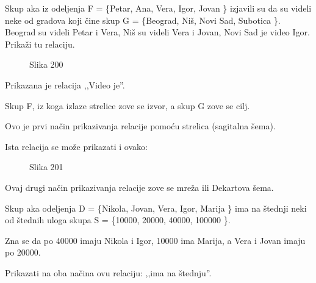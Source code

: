 

    \begin{zad}

        Skup \dj aka iz odeljenja F = \{Petar, Ana, Vera, Igor, Jovan \} izjavili su da su videli neke od gradova koji \v cine skup G = \{Beograd, Ni\v s, Novi Sad, Subotica \}. Beograd su videli Petar i Vera, Ni\v s su videli Vera i Jovan, Novi Sad je video Igor. Prika\v zi tu relaciju.

    \end{zad}



    \begin{figure}[H] 

        \center


        \caption{Slika 200}

        \label{Slika200}

    \end{figure}



    Prikazana je relacija ,,Video je''.



    Skup F, iz koga izlaze strelice zove se izvor, a skup G zove se cilj.



    Ovo je prvi na\v cin prikazivanja relacije pomo\' cu strelica (sagitalna \v sema).



    Ista relacija se mo\v ze prikazati i ovako:



    \begin{figure}[H] 

        \center


        \caption{Slika 201}

        \label{Slika201}

    \end{figure}



    Ovaj drugi na\v cin prikazivanja relacije zove se mre\v za ili Dekartova \v sema.



    \begin{zad}

        Skup \dj aka odeljenja D = \{Nikola, Jovan, Vera, Igor, Marija \} ima na \v stednji neki od \v stednih uloga skupa S = \{10000, 20000, 40000, 100000 \}.



        Zna se da po 40000 imaju Nikola i Igor, 10000 ima Marija, a Vera i Jovan imaju po 20000.



        Prikazati na oba na\v cina ovu relaciju: ,,ima na \v stednju''.

    \end{zad}



